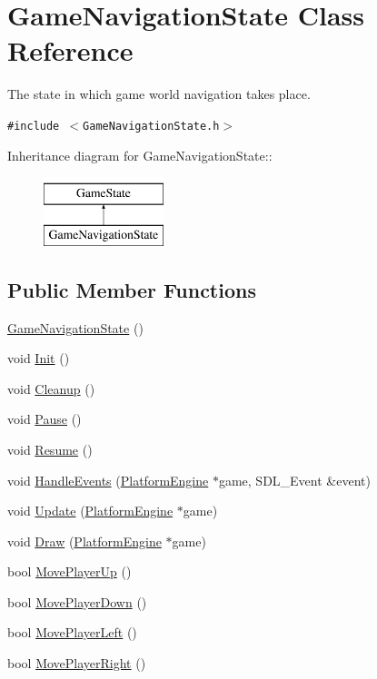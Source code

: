 \hypertarget{class_game_navigation_state}{
\section{GameNavigationState Class Reference}
\label{class_game_navigation_state}
}
The state in which game world navigation takes place.  


{\tt \#include $<$GameNavigationState.h$>$}

Inheritance diagram for GameNavigationState::\begin{figure}[H]
\begin{center}
\leavevmode
\includegraphics[height=2cm]{class_game_navigation_state}
\end{center}
\end{figure}
\subsection*{Public Member Functions}
\begin{CompactItemize}
\item 
\hyperlink{class_game_navigation_state_6a3b93831c85eb5dc3de0a53ca13ddfc}{GameNavigationState} ()
\item 
void \hyperlink{class_game_navigation_state_8f613860bf544476ab9cff9fb7f98201}{Init} ()
\item 
void \hyperlink{class_game_navigation_state_f93a7dbb7eac4b14a6d59cbca32b9abd}{Cleanup} ()
\item 
void \hyperlink{class_game_navigation_state_ac626b511de8af9f32b7a1492a10f861}{Pause} ()
\item 
void \hyperlink{class_game_navigation_state_4d6aee55eddb1978f493206d985fb950}{Resume} ()
\item 
void \hyperlink{class_game_navigation_state_c47e8f7b8802e7b7e7b5076c20313596}{HandleEvents} (\hyperlink{class_platform_engine}{PlatformEngine} $\ast$game, SDL\_\-Event \&event)
\item 
void \hyperlink{class_game_navigation_state_90f5e6d6287a875d8f2737180f46a004}{Update} (\hyperlink{class_platform_engine}{PlatformEngine} $\ast$game)
\item 
void \hyperlink{class_game_navigation_state_a37dce070a906454c512192c067fda09}{Draw} (\hyperlink{class_platform_engine}{PlatformEngine} $\ast$game)
\item 
bool \hyperlink{class_game_navigation_state_fd803365fe0a32b60cf9105ee45b4042}{MovePlayerUp} ()
\item 
bool \hyperlink{class_game_navigation_state_66f8a21e63270473d88b31b06d306111}{MovePlayerDown} ()
\item 
bool \hyperlink{class_game_navigation_state_b8ee346a4f4be2cc3478fdacfb770464}{MovePlayerLeft} ()
\item 
bool \hyperlink{class_game_navigation_state_0b505a64bcf97883bb9e15d0d008174e}{MovePlayerRight} ()
\end{CompactItemize}
